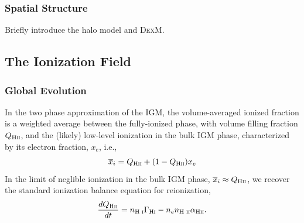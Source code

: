 \subsubsection{Spatial Structure} \label{sec:density_local}
Briefly introduce the halo model \cite{Cooray2002} and \textsc{DexM}.

\subsection{The Ionization Field}

\subsubsection{Global Evolution} \label{sec:ionization_global}
In the two phase approximation of the IGM, the volume-averaged ionized fraction is a weighted average between the fully-ionized phase, with volume filling fraction $Q_{\text{H} {\textsc{ii}}}$, and the (likely) low-level ionization in the bulk IGM phase, characterized by its electron fraction, $x_e$, i.e.,
\begin{equation}
	\overline{x}_i = Q_{\text{H} {\textsc{ii}}} + (1 - Q_{\text{H} {\textsc{ii}}}) x_e
\end{equation}
In the limit of neglible ionization in the bulk IGM phase, $\overline{x}_i \approx Q_{\text{H} {\textsc{ii}}}$, we recover the standard ionization balance equation for reionization,
\begin{equation}
	\frac{d Q_{\text{H} {\textsc{ii}}}}{dt} = n_{\text{H } \textsc{i}} \Gamma_{\text{H} {\textsc{i}}} - n_e n_{\text{H } \textsc{ii}} \alpha_{\text{H} {\textsc{ii}}} . \label{eq:ion_balance}
\end{equation}



